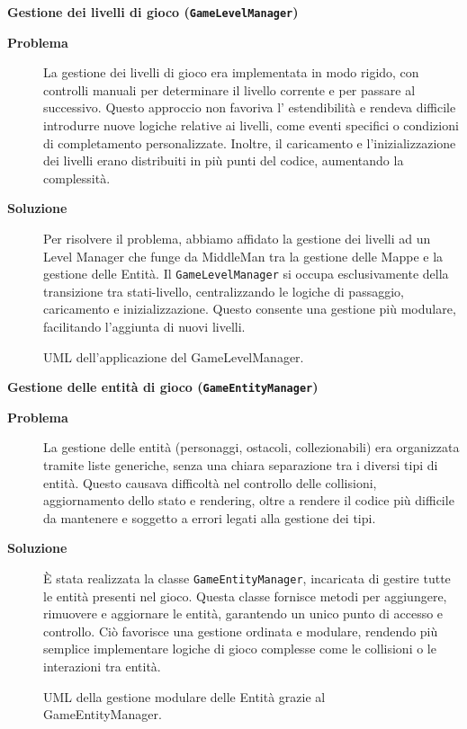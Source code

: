 \documentclass[a4paper,12pt]{report}
\begin{document}
\noindent
\textbf{Gestione dei livelli di gioco (\texttt{GameLevelManager})}
\begin{description}
	\item[\textbf{Problema}]
	      La gestione dei livelli di gioco era implementata in modo rigido, con controlli manuali per determinare il livello corrente e per passare al successivo. Questo approccio non favoriva l'
	      estendibilità e rendeva difficile introdurre nuove logiche relative ai livelli, come eventi specifici o condizioni di completamento personalizzate. Inoltre, il caricamento e l'inizializzazione dei
	      livelli erano distribuiti in più punti del codice, aumentando la complessità.

	\item[\textbf{Soluzione}]
	      Per risolvere il problema, abbiamo affidato la gestione dei livelli ad un Level Manager che funge da MiddleMan tra la gestione delle Mappe e la gestione delle Entità. Il \texttt{GameLevelManager}
	      si occupa esclusivamente della transizione tra stati-livello, centralizzando le logiche di passaggio, caricamento e inizializzazione. Questo consente una gestione più modulare, facilitando
	      l'aggiunta di nuovi livelli.
\end{description}
\begin{figure}[H]
	\centering{}
	
	\caption{UML dell'applicazione del GameLevelManager.}
	\label{img:GameLevelManager}
\end{figure}

\noindent
\textbf{Gestione delle entità di gioco (\texttt{GameEntityManager})}
\begin{description}
	\item[\textbf{Problema}]
	      La gestione delle entità (personaggi, ostacoli, collezionabili) era organizzata tramite liste generiche, senza una chiara separazione tra i diversi tipi di entità. Questo causava
	      difficoltà nel controllo delle collisioni, aggiornamento dello stato e rendering, oltre a rendere il codice più difficile da mantenere e soggetto a errori legati alla gestione dei tipi.

	\item[\textbf{Soluzione}]
	      È stata realizzata la classe \texttt{GameEntityManager}, incaricata di gestire tutte le entità presenti nel gioco. Questa classe fornisce metodi per aggiungere, rimuovere e aggiornare le
	      entità, garantendo un unico punto di accesso e controllo. Ciò favorisce una gestione ordinata e modulare, rendendo più semplice implementare logiche di gioco complesse come le collisioni o
	      le interazioni tra entità.
\end{description}
\begin{figure}[H]
	\centering{}
	
	\caption{UML della gestione modulare delle Entità grazie al GameEntityManager.}
	\label{img:GameEntityManager}
\end{figure}
\end{document}
